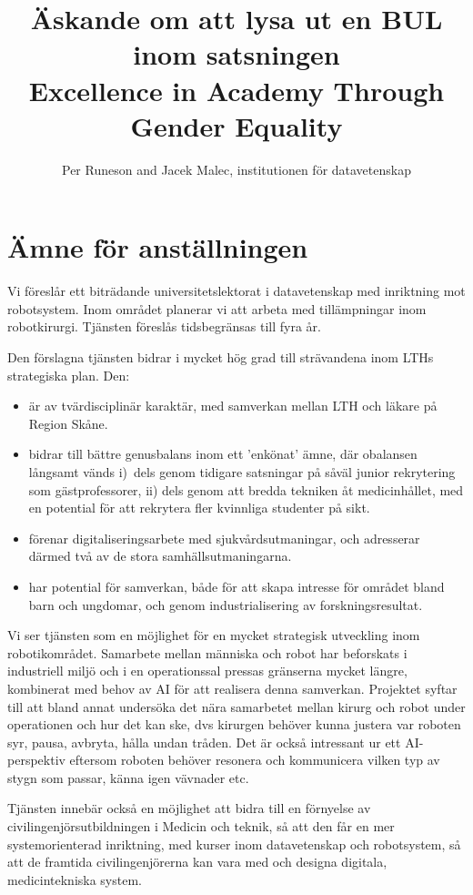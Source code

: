 \documentclass[11pt,a4paper]{article}
\title{Äskande om att lysa ut en BUL inom satsningen\\Excellence in Academy Through Gender Equality }
\author{Per Runeson and Jacek Malec, institutionen för  datavetenskap}
\begin{document}
\maketitle
\section{Ämne för anställningen}
Vi föreslår ett biträdande universitetslektorat i datavetenskap med inriktning mot robotsystem. Inom området planerar vi att arbeta med tillämpningar inom robotkirurgi. Tjänsten föreslås tidsbegränsas till fyra år. 

Den förslagna tjänsten bidrar i mycket hög grad till strävandena inom LTHs strategiska plan. Den:
\begin{itemize}
\item är av tvärdisciplinär karaktär, med samverkan mellan LTH och läkare på Region Skåne.
\item bidrar till bättre genusbalans inom ett ’enkönat' ämne, där obalansen långsamt vänds 
i)~dels genom tidigare satsningar på såväl junior rekrytering som gästprofessorer, ii) dels genom att bredda tekniken åt medicinhållet, med en potential för att rekrytera fler kvinnliga studenter på sikt.
\item förenar digitaliseringsarbete med sjukvårdsutmaningar, och adresserar därmed två av de stora samhällsutmaningarna. 
\item har potential för samverkan, både för att skapa intresse för området bland barn och ungdomar, och genom industrialisering av forskningsresultat.
\end{itemize}

Vi ser tjänsten som en möjlighet för en mycket strategisk utveckling inom robotikområdet. Samarbete mellan människa och robot har beforskats i industriell miljö och i en operationssal pressas gränserna mycket längre, kombinerat med behov av AI för att realisera denna samverkan. Projektet syftar till att bland annat  undersöka det nära samarbetet mellan kirurg och robot under operationen och hur det kan ske, dvs kirurgen behöver kunna justera var roboten syr, pausa, avbryta, hålla undan tråden. Det är också intressant ur ett AI-perspektiv eftersom roboten behöver resonera och kommunicera vilken typ av stygn som passar, känna igen vävnader etc.

Tjänsten innebär också en möjlighet att bidra till en förnyelse av civilingenjörsutbildningen i Medicin och teknik, så att den får en mer systemorienterad inriktning, med kurser inom datavetenskap och robotsystem, så att de framtida civilingenjörerna kan vara med och designa digitala, medicintekniska system.
\end{document}
